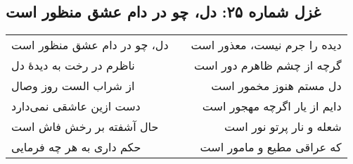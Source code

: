 \begin{center}
\section*{غزل شماره ۲۵: دل، چو در دام عشق منظور است}
\label{sec:025}
\begin{longtable}{l p{0.5cm} r}
دل، چو در دام عشق منظور است
&&
دیده را جرم نیست، معذور است
\\
ناظرم در رخت به دیدهٔ دل
&&
گرچه از چشم ظاهرم دور است
\\
از شراب الست روز وصال
&&
دل مستم هنوز مخمور است
\\
دست ازین عاشقی نمی‌دارد
&&
دایم از یار اگرچه مهجور است
\\
حال آشفته بر رخش فاش است
&&
شعله و نار پرتو نور است
\\
حکم داری به هر چه فرمایی
&&
که عراقی مطیع و مامور است
\\
\end{longtable}
\end{center}
